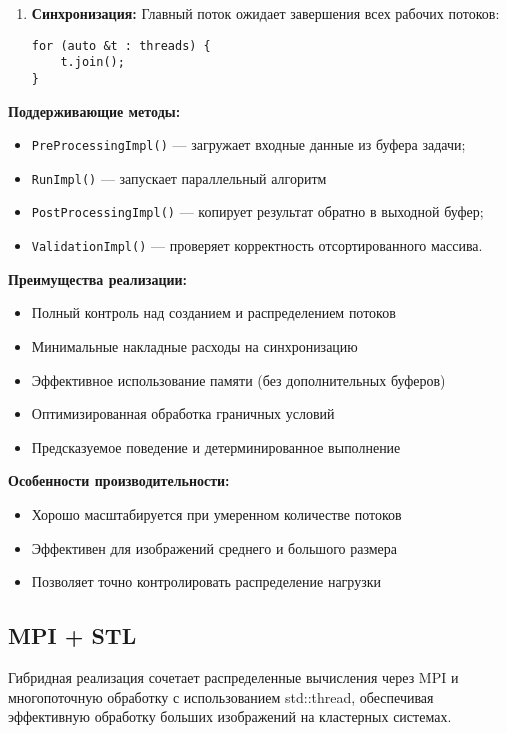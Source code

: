 \documentclass[12pt]{article}
\begin{document}
\begin{enumerate}
\item \textbf{Синхронизация:}
Главный поток ожидает завершения всех рабочих потоков:
\begin{lstlisting}
for (auto &t : threads) {
    t.join();
}
\end{lstlisting}
\end{enumerate}

\textbf{Поддерживающие методы:}
\begin{itemize}
  \item \texttt{PreProcessingImpl()} — загружает входные данные из буфера задачи;
  \item \texttt{RunImpl()} — запускает параллельный алгоритм
  \item \texttt{PostProcessingImpl()} — копирует результат обратно в выходной буфер;
  \item \texttt{ValidationImpl()} — проверяет корректность отсортированного массива.
\end{itemize}

\textbf{Преимущества реализации:}
\begin{itemize}
\item Полный контроль над созданием и распределением потоков
\item Минимальные накладные расходы на синхронизацию
\item Эффективное использование памяти (без дополнительных буферов)
\item Оптимизированная обработка граничных условий
\item Предсказуемое поведение и детерминированное выполнение
\end{itemize}

\textbf{Особенности производительности:}
\begin{itemize}
\item Хорошо масштабируется при умеренном количестве потоков
\item Эффективен для изображений среднего и большого размера
\item Позволяет точно контролировать распределение нагрузки
\end{itemize}

\subsection{MPI + STL}

\hspace*{1.25em}Гибридная реализация сочетает распределенные вычисления через MPI и многопоточную обработку с использованием std::thread, обеспечивая эффективную обработку больших изображений на кластерных системах.
\end{document}

